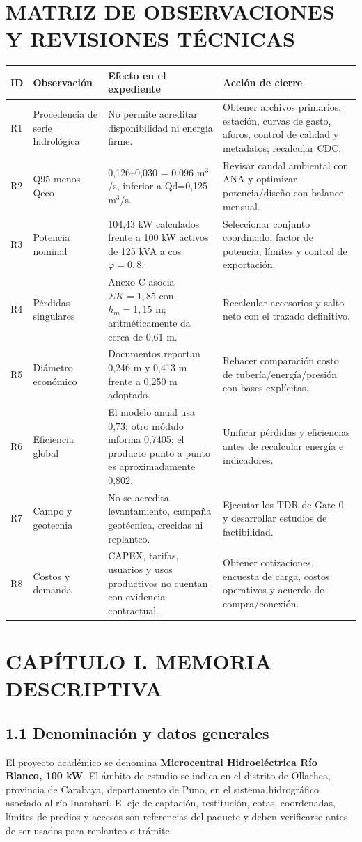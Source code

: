 \documentclass[11pt,a4paper]{article}
\newcommand{\capitulo}[2]{\clearpage\section*{CAPÍTULO #1. #2}\addcontentsline{toc}{section}{Capítulo #1. #2}}
\begin{document}
\section*{MATRIZ DE OBSERVACIONES Y REVISIONES TÉCNICAS}
\begin{longtable}{p{.65cm}p{3.4cm}p{4.0cm}p{5.0cm}}
\toprule ID & Observación & Efecto en el expediente & Acción de cierre\\\midrule
\endhead
R1 & Procedencia de serie hidrológica & No permite acreditar disponibilidad ni energía firme. & Obtener archivos primarios, estación, curvas de gasto, aforos, control de calidad y metadatos; recalcular CDC.\\
R2 & Q95 menos Qeco & 0,126--0,030 = 0,096 m$^3$/s, inferior a Qd=0,125 m$^3$/s. & Revisar caudal ambiental con ANA y optimizar potencia/diseño con balance mensual.\\
R3 & Potencia nominal & 104,43 kW calculados frente a 100 kW activos de 125 kVA a cos $\varphi=0,8$. & Seleccionar conjunto coordinado, factor de potencia, límites y control de exportación.\\
R4 & Pérdidas singulares & Anexo C asocia $\Sigma K=1,85$ con $h_m=1,15$ m; aritméticamente da cerca de 0,61 m. & Recalcular accesorios y salto neto con el trazado definitivo.\\
R5 & Diámetro económico & Documentos reportan 0,246 m y 0,413 m frente a 0,250 m adoptado. & Rehacer comparación costo de tubería/energía/presión con bases explícitas.\\
R6 & Eficiencia global & El modelo anual usa 0,73; otro módulo informa 0,7405; el producto punto a punto es aproximadamente 0,802. & Unificar pérdidas y eficiencias antes de recalcular energía e indicadores.\\
R7 & Campo y geotecnia & No se acredita levantamiento, campaña geotécnica, crecidas ni replanteo. & Ejecutar los TDR de Gate 0 y desarrollar estudios de factibilidad.\\
R8 & Costos y demanda & CAPEX, tarifas, usuarios y usos productivos no cuentan con evidencia contractual. & Obtener cotizaciones, encuesta de carga, costos operativos y acuerdo de compra/conexión.\\
\bottomrule
\end{longtable}

\tableofcontents
\clearpage

\capitulo{I}{MEMORIA DESCRIPTIVA}
\subsection*{1.1 Denominación y datos generales}
El proyecto académico se denomina \textbf{Microcentral Hidroeléctrica Río Blanco, 100 kW}. El ámbito de estudio se indica en el distrito de Ollachea, provincia de Carabaya, departamento de Puno, en el sistema hidrográfico asociado al río Inambari. El eje de captación, restitución, cotas, coordenadas, límites de predios y accesos son referencias del paquete y deben verificarse antes de ser usados para replanteo o trámite.
\end{document}
